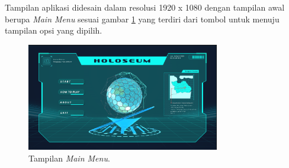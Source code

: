 		Tampilan aplikasi didesain dalam resolusi 1920 x 1080 dengan tampilan awal berupa \textit{Main Menu} sesuai gambar \ref{fig:sb_mainmenu} yang terdiri dari tombol untuk menuju tampilan opsi yang dipilih.
		\begin{figure}[H]
			\includegraphics[width=0.75\textwidth]{img/bab3/ui/mainmenu.png}
			\caption{Tampilan \textit{Main Menu}.}
			\label{fig:sb_mainmenu}
		\end{figure}
		\vspace{-2ex}
		
